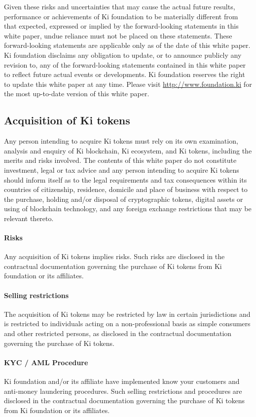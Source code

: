 Given these risks and uncertainties that may cause the actual future results, performance or achievements of Ki foundation to be materially different from that expected, expressed or implied by the forward-looking statements in this white paper, undue reliance must not be placed on these statements.
These forward-looking statements are applicable only as of the date of this white paper. Ki foundation disclaims any obligation to update, or to announce publicly any revision to, any of the forward-looking statements contained in this white paper to reflect future actual events or developments.
Ki foundation reserves the right to update this white paper at any time. Please visit \url{http://www.foundation.ki} for the most up-to-date version of this white paper.
\subsection{Acquisition of Ki tokens}
Any person intending to acquire Ki tokens must rely on its own examination, analysis and enquiry of Ki blockchain, Ki ecosystem, and Ki tokens, including the merits and risks involved. The contents of this white paper do not constitute investment, legal or tax advice and any person intending to acquire Ki tokens should inform itself as to the legal requirements and tax consequences within its countries of citizenship, residence, domicile and place of business with respect to the purchase, holding and/or disposal of cryptographic tokens, digital assets or using of blockchain technology, and any foreign exchange restrictions that may be relevant thereto.
\paragraph{Risks}
Any acquisition of Ki tokens implies risks. Such risks are disclosed in the contractual documentation governing the purchase of Ki tokens from Ki foundation or its affiliates.
\paragraph{Selling restrictions}
The acquisition of Ki tokens may be restricted by law in certain jurisdictions and is restricted to individuals acting on a non-professional basis as simple consumers and other restricted persons, as disclosed in the contractual documentation governing the purchase of Ki tokens.
\paragraph{KYC / AML Procedure}
Ki foundation and/or its affiliate have implemented know your customers and anti-money laundering procedures. Such selling restrictions and procedures are disclosed in the contractual documentation governing the purchase of Ki tokens from Ki foundation or its affiliates.

